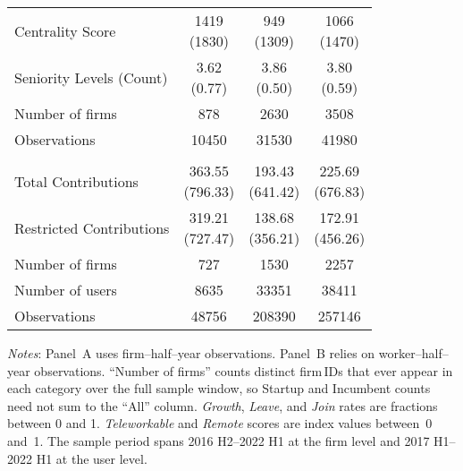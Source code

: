 \begin{table}[H]
\begin{threeparttable}
\begin{tabular}{lcc@{\hspace{6pt}}c}
Centrality Score & \makecell{1419 \\ (1830)} & \makecell{949 \\ (1309)} & \makecell{1066 \\ (1470)} \\
Seniority Levels (Count) & \makecell{3.62 \\ (0.77)} & \makecell{3.86 \\ (0.50)} & \makecell{3.80 \\ (0.59)} \\
\addlinespace
\midrule
Number of firms & 878 & 2630 & 3508 \\
Observations & 10450 & 31530 & 41980 \\
        \addlinespace
        \midrule
        \addlinespace
        \multicolumn{4}{l}{\textbf{\uline{Panel B: User-level}}}\\[0.3em]
        Total Contributions & \makecell{363.55 \\ (796.33)} & \makecell{193.43 \\ (641.42)} & \makecell{225.69 \\ (676.83)} \\
Restricted Contributions & \makecell{319.21 \\ (727.47)} & \makecell{138.68 \\ (356.21)} & \makecell{172.91 \\ (456.26)} \\
\addlinespace
\midrule
Number of firms & 727 & 1530 & 2257 \\
Number of users & 8635 & 33351 & 38411 \\
Observations & 48756 & 208390 & 257146 \\
        \bottomrule
        \end{tabular}
        \begin{tablenotes}[flushleft]
\footnotesize
\item \emph{Notes}: Panel~A uses firm--half--year observations. Panel~B relies on worker--half--year observations. ``Number of firms'' counts distinct firm\,IDs that ever appear in each category over the full sample window, so Startup and Incumbent counts need not sum to the ``All'' column. \textit{Growth}, \textit{Leave}, and \textit{Join} rates are fractions between 0 and 1. \textit{Teleworkable} and \textit{Remote} scores are index values between~0 and~1.  The sample period spans 2016 H2–2022 H1 at the firm level and 2017 H1–2022 H1 at the user level.
\end{tablenotes}
        \end{threeparttable}
        \end{table}
